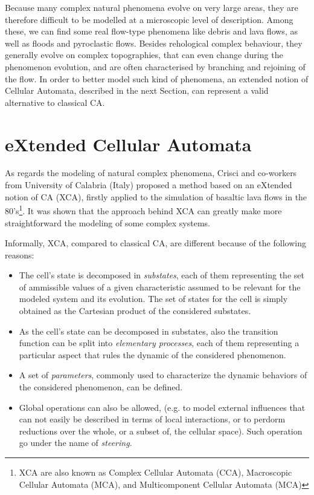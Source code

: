 Because many complex natural phenomena evolve on very large areas,
they are therefore difficult to be modelled at a microscopic level of
description. Among these, we can find some real flow-type phenomena
like debris and lava flows, as well as floods and pyroclastic
flows. Besides rehological complex behaviour, they generally evolve on
complex topographies, that can even change during the phenomenon
evolution, and are often characterised by branching and rejoining of
the flow. In order to better model such kind of phenomena, an extended
notion of Cellular Automata, described in the next Section, can
represent a valid alternative to classical CA.

\section{eXtended Cellular Automata}

As regards the modeling of natural complex phenomena, Crisci and
co-workers from University of Calabria (Italy) proposed a method based
on an eXtended notion of CA (XCA), firstly applied to the simulation
of basaltic lava flows in the 80's\footnote{XCA are also known as
  Complex Cellular Automata (CCA), Macroscopic Cellular Automata
  (MCA), and Multicomponent Cellular Automata (MCA)}. It was shown
that the approach behind XCA can greatly make more straightforward the
modeling of some complex systems.

Informally, XCA, compared to classical CA, are different because of
the following reasons:

\begin{itemize}

\item The cell's state is decomposed in \emph{substates}, each of them
  representing the set of ammissible values of a given characteristic
  assumed to be relevant for the modeled system and its evolution. The
  set of states for the cell is simply obtained as the Cartesian
  product of the considered substates.

\item As the cell's state can be decomposed in substates, also the
  transition function can be split into \emph{elementary processes},
  each of them representing a particular aspect that rules the dynamic
  of the considered phenomenon.

\item A set of \emph{parameters}, commonly used to characterize the dynamic behaviors of the considered phenomenon, can be defined.

\item Global operations can also be allowed, (e.g. to model external
  influences that can not easily be described in terms of local
  interactions, or to perdorm reductions over the whole, or a subset of,
  the cellular space). Such operation go under the name of
  \emph{steering}.
  
\end{itemize}


